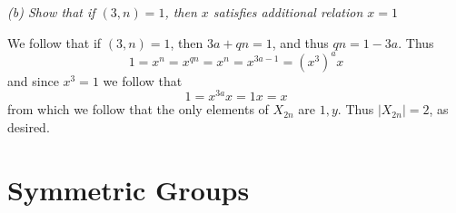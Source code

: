 \documentclass[11pt,oneside,titlepage]{book}
\begin{document}
\textit{(b) Show that if $(3, n) = 1$, then $x$ satisfies additional relation $x = 1$}

We follow that if $(3, n) = 1$, then $3a + qn = 1$, and thus $qn = 1 - 3a$. Thus
$$1 = x^n = x^{qn} = x^n = x^{3a - 1}= (x^3)^a x$$
and since $x^3 = 1$ we follow that
$$1 = x^{3a} x = 1x = x$$
from which we follow that the only elements of $X_{2n}$ are $1, y$. Thus $|X_{2n}| = 2$, as
desired.

\section{Symmetric Groups}
\end{document}

